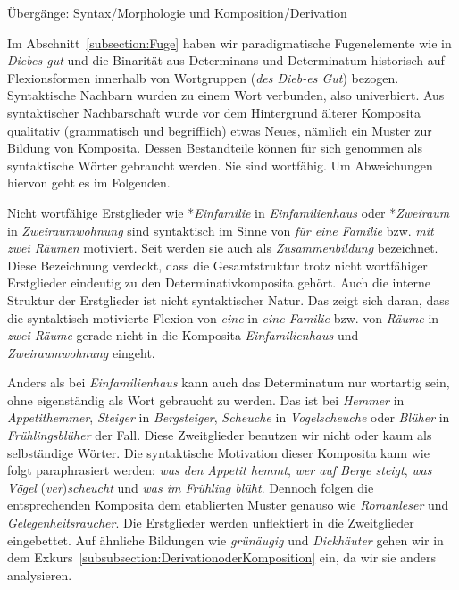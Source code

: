 \newpage
\begin{Exkurs}{Übergänge: Syntax/Morphologie und Komposition/Derivation}\label{subsection:Übergänge} 

Im Abschnitt~\ref{subsection:Fuge} haben wir paradigmatische Fugenelemente wie in \textit{Diebes-gut} und die Binarität aus Determinans und Determinatum historisch auf Flexionsformen innerhalb von Wortgruppen (\textit{des Dieb-es Gut}) bezogen. Syntaktische Nachbarn wurden zu einem Wort verbunden, also univerbiert. Aus syntaktischer Nachbarschaft wurde vor dem Hintergrund älterer Komposita qualitativ (grammatisch und begrifflich) etwas Neues, nämlich ein Muster zur Bildung von Komposita. Dessen Bestandteile können für sich genommen als syntaktische Wörter gebraucht werden. Sie sind wortfähig. Um Abweichungen hiervon geht es im Folgenden.

Nicht wortfähige Erstglieder wie *\textit{Einfamilie} in \textit{Einfamilienhaus} oder *\textit{Zweiraum} in \textit{Zweiraumwohnung} sind syntaktisch im Sinne von \textit{für eine Familie} bzw. \textit{mit zwei Räumen} motiviert. Seit \citet[14--15]{Henzen1965} werden sie auch als \textit{Zusammenbildung} bezeichnet. Diese Bezeichnung verdeckt, dass die Gesamtstruktur trotz nicht wortfähiger Erstglieder eindeutig zu den Determinativkomposita gehört. Auch die interne Struktur der Erstglieder ist nicht syntaktischer Natur. Das zeigt sich daran, dass die syntaktisch motivierte Flexion von \textit{eine} in \textit{eine Familie} bzw. von \textit{Räume} in \textit{zwei Räume} gerade nicht in die Komposita \textit{Einfamilienhaus} und \textit{Zweiraumwohnung} eingeht. 

Anders als bei \textit{Einfamilienhaus} kann auch das Determinatum nur wortartig sein, ohne eigenständig als Wort gebraucht zu werden. Das ist bei \textit{Hemmer} in \textit{Appetithemmer}, \textit{Steiger} in \textit{Bergsteiger}, \textit{Scheuche} in \textit{Vogelscheuche} oder \textit{Blüher} in \textit{Frühlingsblüher} der Fall. Diese Zweitglieder benutzen wir nicht oder kaum als selbständige Wörter. Die syntaktische Motivation dieser Komposita kann wie folgt paraphrasiert werden: \textit{was den Appetit hemmt}, \textit{wer auf Berge steigt}, \textit{was Vögel} (\textit{ver})\textit{scheucht} und \textit{was im Frühling blüht}. Dennoch folgen die entsprechenden Komposita dem etablierten Muster genauso wie \textit{Romanleser} und \textit{Gelegenheitsraucher}. Die Erstglieder werden unflektiert in die Zweitglieder eingebettet. Auf ähnliche Bildungen wie \textit{grünäugig} und \textit{Dickhäuter} gehen wir in dem Exkurs~\ref{subsubsection:DerivationoderKomposition} ein, da wir sie anders analysieren.     



\end{Exkurs}
